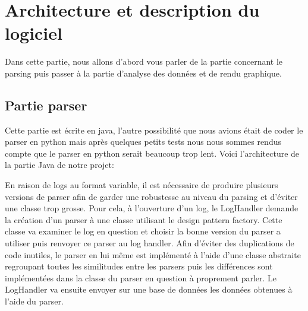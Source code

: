 \chapter{Architecture et description du logiciel}
Dans cette partie, nous allons d'abord vous parler de la partie concernant le parsing puis passer à la partie d'analyse des données et de rendu graphique.

\section{Partie parser}
Cette partie est écrite en java, l'autre possibilité que nous avions était de coder le parser en python mais après quelques petits tests nous nous sommes rendus compte que le parser en python serait beaucoup trop lent. Voici l'architecture de la partie Java de notre projet:

En raison de logs au format variable, il est nécessaire de produire plusieurs versions de parser afin de garder une robustesse au niveau du parsing et d'éviter une classe trop grosse. Pour cela, à l'ouverture d'un log, le LogHandler demande la création d'un parser à une classe utilisant le design pattern factory. Cette classe va examiner le log en question et choisir la bonne version du parser a utiliser puis renvoyer ce parser au log handler. Afin d'éviter des duplications de code inutiles, le parser en lui même est implémenté à l'aide d'une classe abstraite regroupant toutes les similitudes entre les parsers puis les différences sont implémentées dans la classe du parser en question à proprement parler. Le LogHandler va ensuite envoyer sur une base de données les données obtenues à l'aide du parser.

